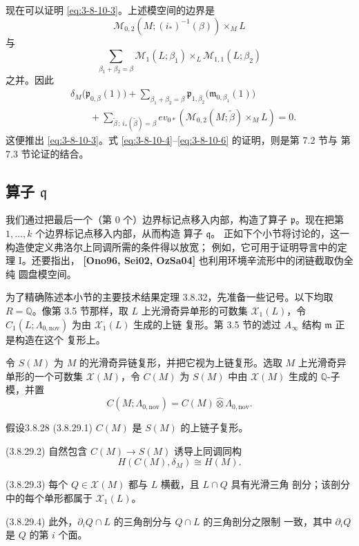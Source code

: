 现在可以证明 \eqref{eq:3-8-10-3}。上述模空间的边界是
\[
 \mathcal M_{0,2}(M;(i_*)^{-1}(\beta))
 \mathbin{\times_M}L
\]
与
\[
 \sum_{\beta_1+\beta_2=\beta}
 \mathcal M_1(L;\beta_1)
 \mathbin{\times_L}
 \mathcal M_{1,1}(L;\beta_2)
\]
之并。因此
\[
\begin{aligned}
 &\delta_M\bigl(\mathfrak p_{0,\beta}(1)\bigr)
 +\sum_{\beta_1+\beta_2=\beta}
 \mathfrak p_{1,\beta_2}
 \bigl(\mathfrak m_{0,\beta_1}(1)\bigr)\\
 &\qquad
 +\sum_{\widetilde\beta\,;\,i_*(\widetilde\beta)=\beta}
 ev_{0*}\left(
 \mathcal M_{0,2}(M;\widetilde\beta)
 \mathbin{\times_M}L
 \right)=0.
\end{aligned}
\]
这便推出 \eqref{eq:3-8-10-3}。式
\eqref{eq:3-8-10-4}--\eqref{eq:3-8-10-6} 的证明，则是第 7.2 节与
第 7.3 节论证的结合。

\subsection{算子 $\mathfrak q$}
\label{subsec:3-8-4}

我们通过把最后一个（第 $0$ 个）边界标记点移入内部，构造了算子
$\mathfrak p$。现在把第 $1,\ldots,k$ 个边界标记点移入内部，从而构造
算子 $\mathfrak q$。
正如下个小节将讨论的，这一构造使定义弗洛尔上同调所需的条件得以放宽；
例如，它可用于证明导言中的定理 I。还要指出，
\textbf{[Ono96, Sei02, OzSa04]} 也利用环境辛流形中的闭链截取伪全纯
圆盘模空间。

为了精确陈述本小节的主要技术结果定理 3.8.32，先准备一些记号。以下均取
$R=\mathbb Q$。像第 3.5 节那样，取 $L$ 上光滑奇异单形的可数集
$\mathcal X_1(L)$，令
$C_1(L;\Lambda_{0,\mathrm{nov}})$ 为由 $\mathcal X_1(L)$ 生成的上链
复形。第 3.5 节的滤过 $A_\infty$ 结构 $\mathfrak m$ 正是构造在这个
复形上。

令 $S(M)$ 为 $M$ 的光滑奇异链复形，并把它视为上链复形。选取
$M$ 上光滑奇异单形的一个可数集 $\mathcal X(M)$，令 $C(M)$ 为
$S(M)$ 中由 $\mathcal X(M)$ 生成的 $\mathbb Q$-子模，并置
\[
 C(M;\Lambda_{0,\mathrm{nov}})
 =
 C(M)\widehat\otimes\Lambda_{0,\mathrm{nov}}.
\]

\begin{statement}{假设}{3.8.28}\label{assump:3-8-28}
\noindent\textup{(3.8.29.1)}
$C(M)$ 是 $S(M)$ 的上链子复形。

\noindent\textup{(3.8.29.2)}
自然包含 $C(M)\to S(M)$ 诱导上同调同构
\[
 H(C(M),\delta_M)\cong H(M).
\]

\noindent\textup{(3.8.29.3)}
每个 $Q\in\mathcal X(M)$ 都与 $L$ 横截，且 $L\cap Q$ 具有光滑三角
剖分；该剖分中的每个单形都属于 $\mathcal X_1(L)$。

\noindent\textup{(3.8.29.4)}
此外，$\partial_iQ\cap L$ 的三角剖分与 $Q\cap L$ 的三角剖分之限制
一致，其中 $\partial_iQ$ 是 $Q$ 的第 $i$ 个面。
\end{statement}

